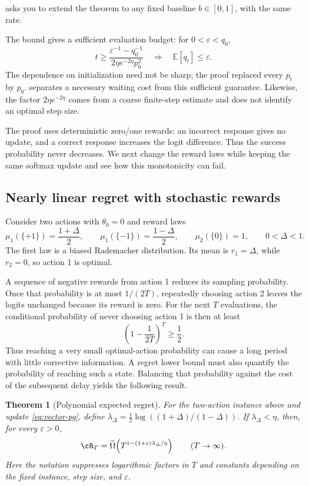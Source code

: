 \documentclass[11pt,twoside]{article}
\newcommand{\E}{\mathbb E}
\newtheorem{theorem}{Theorem}[section]
\theoremstyle{definition}
\theoremstyle{remark}
\begin{document}
 asks you to extend the theorem to any fixed
baseline $b\in[0,1]$, with the same rate.

The bound gives a sufficient evaluation budget: for $0<\varepsilon<q_0$,
\[
 t\ge\frac{\varepsilon^{-1}-q_0^{-1}}{2\eta e^{-2\eta}p_0^2}
 \quad\Longrightarrow\quad \E[q_t]\le\varepsilon.
\]
The dependence on initialization need not be sharp; the proof replaced every
$p_t$ by $p_0$.  separates a necessary waiting
cost from this sufficient guarantee. Likewise, the factor $2\eta e^{-2\eta}$
comes from a coarse finite-step estimate and does not identify an optimal
step size.

The proof uses deterministic zero/one rewards: an incorrect response gives
no update, and a correct response increases the logit difference. Thus the
success probability never decreases. We next change the reward laws while
keeping the same softmax update and see how this monotonicity can fail.

\subsection{Nearly linear regret with stochastic rewards}
\label{sec:slow}

Consider two actions with $\theta_0=0$ and reward laws
\[
 \mu_1(\{+1\})=\frac{1+\Delta}{2},\qquad
 \mu_1(\{-1\})=\frac{1-\Delta}{2},\qquad
 \mu_2(\{0\})=1,\qquad 0<\Delta<1.
\]
The first law is a biased Rademacher distribution. Its mean is
$r_1=\Delta$, while $r_2=0$, so action 1 is optimal.

A sequence of negative rewards from action 1 reduces its sampling
probability. Once that probability is at most $1/(2T)$, repeatedly choosing
action 2 leaves the logits unchanged because its reward is zero. For the
next $T$ evaluations, the conditional probability of never choosing action 1
is then at least
\[
 \left(1-\frac1{2T}\right)^T\ge\frac12.
\]
Thus reaching a very small optimal-action probability can cause a long period
with little corrective information. A regret lower bound must also quantify
the probability of reaching such a state. Balancing that probability against
the cost of the subsequent delay yields the following result.

\begin{theorem}[Polynomial expected regret]
\label{thm:slow}
For the two-action instance above and update \cref{eq:vector-pg}, define
$\lambda_\Delta=\tfrac12\log((1+\Delta)/(1-\Delta))$.
If $\lambda_\Delta<\eta$, then, for every $\varepsilon>0$,
\begin{equation}
 \cR_T=\widetilde\Omega\!\left(
 T^{1-(1+\varepsilon)\lambda_\Delta/\eta}\right)
 \qquad(T\to\infty).
 \label{eq:slow-regret}
\end{equation}
Here the notation suppresses logarithmic factors in $T$ and constants
depending on the fixed instance, step size, and $\varepsilon$.
\end{theorem}
\end{document}

